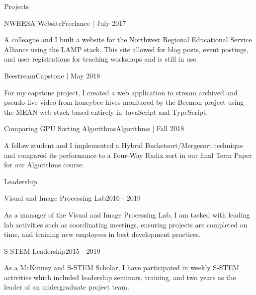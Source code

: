 \documentclass{resume} %
\begin{document}
\begin{rSection}{Projects}
\begin{rSubsection}{NWRESA Website}{Freelance | July 2017}{}{}{}
    \item A colleague and I built a website for the Northwest Regional Educational Service Alliance using the LAMP stack.  This site allowed for blog posts, event postings, and user registrations for teaching workshops and is still in use. 
\end{rSubsection}
\begin{rSubsection}{Beestream}{Capstone | May 2018}{}{}{}
    \item For my capstone project, I created a web application to stream archived and pseudo-live video from honeybee hives monitored by the Beemon project using the MEAN web stack based entirely in JavaScript and TypeScript.  
\end{rSubsection}
\begin{rSubsection}{Comparing GPU Sorting Algorithms}{Algorithms | Fall 2018}{}{}{}
    \item A fellow student and I implemented a Hybrid Bucketsort/Mergesort technique and compared its performance to a Four-Way Radix sort in our final Term Paper for our Algorithms course.   
\end{rSubsection}

\end{rSection}


\begin{rSection}{Leadership}
\begin{rSubsection}{Visual and Image Processing Lab}{2016 - 2019}{}{}{}
    \item As a manager of the Visual and Image Processing Lab, I am tasked with leading lab activities such as coordinating meetings, ensuring projects are completed on time, and training new employees in best development practices.  
\end{rSubsection}
\begin{rSubsection}{S-STEM Leadership}{2015 - 2019}{}{}{}
    \item As a McKinney and S-STEM Scholar, I have participated in weekly S-STEM activities which included leadership seminars, training, and two years as the leader of an undergraduate project team.  
\end{rSubsection}
\end{rSection}
\end{document}
